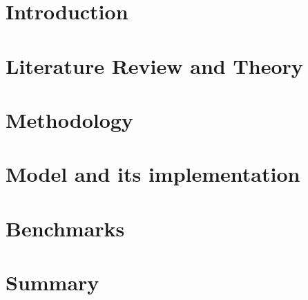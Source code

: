 \chapter{Introduction}\label{ch:introduction}


\chapter{Literature Review and Theory}\label{ch:first_chapter}


\chapter{Methodology}\label{ch:second_chapter}


\chapter{Model and its implementation}\label{ch:impl}


\chapter{Benchmarks}\label{ch:impl-bench}


\chapter{Summary}\label{ch:summary}

